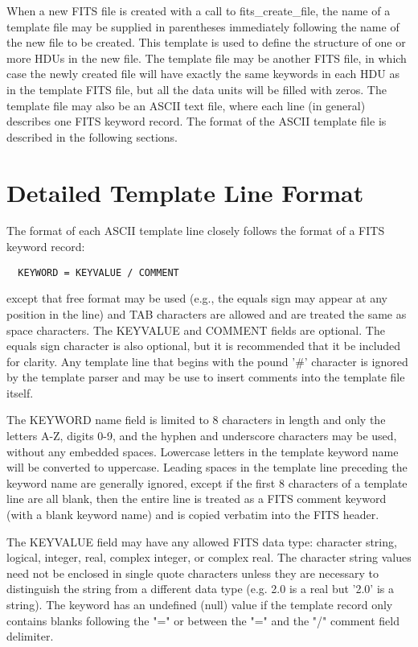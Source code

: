 \documentclass[11pt]{book}
\begin{document}
When a new FITS file is created with a call to fits\_create\_file, the
name of a template file may be supplied in parentheses immediately
following the name of the new file to be created.  This template is
used to define the structure of one or more HDUs in the new file.  The
template file may be another FITS file, in which case the newly created
file will have exactly the same keywords in each HDU as in the template
FITS file, but all the data units will be filled with zeros.  The
template file may also be an ASCII text file, where each line (in
general) describes one FITS keyword record.  The format of the ASCII
template file is described in the following sections.


\section{Detailed Template Line Format}

The format of each ASCII template line closely follows the format of a
FITS keyword record:

\begin{verbatim}
  KEYWORD = KEYVALUE / COMMENT
\end{verbatim}
except that free format may be used (e.g., the equals sign may appear
at any position in the line) and TAB characters are allowed and are
treated the same as space characters.  The KEYVALUE and COMMENT fields
are optional.  The equals sign character is also optional, but it is
recommended that it be included for clarity.  Any template line that
begins with the pound '\#' character is ignored by the template parser
and may be use to insert comments into the template file itself.

The KEYWORD name field is limited to 8 characters in length and only
the letters A-Z, digits 0-9, and the hyphen and underscore characters
may be used, without any embedded spaces. Lowercase letters in the
template keyword name will be converted to uppercase.  Leading spaces
in the template line preceding the keyword name are generally ignored,
except if the first 8 characters of a template line are all blank, then
the entire line is treated as a FITS comment keyword (with a blank
keyword name) and is copied verbatim into the FITS header.

The KEYVALUE field may have any allowed  FITS  data type: character
string, logical, integer, real, complex integer, or complex real.  The
character string values need not be enclosed in single quote characters
unless they are necessary to distinguish the string from a different
data type (e.g.  2.0 is a real but '2.0' is a string).  The keyword has
an undefined (null) value if the template record only contains blanks
following the "=" or between the "=" and the "/" comment field
delimiter.
\end{document}

